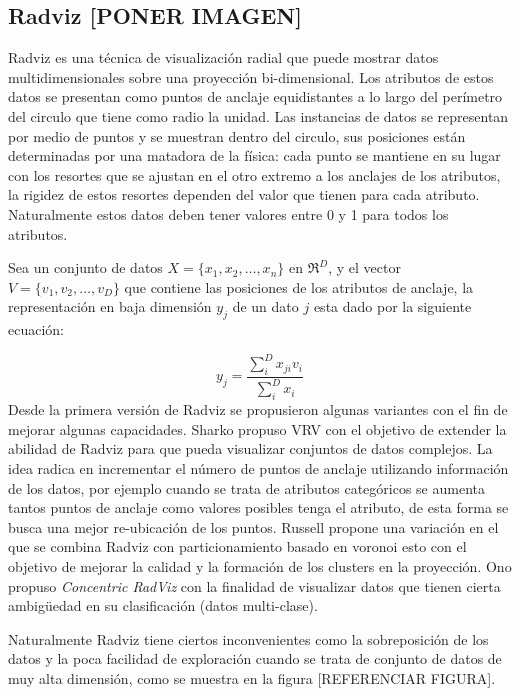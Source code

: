 \subsection{Radviz \textcolor[rgb]{0.2,0.8,0.2}{[PONER IMAGEN]}} 
Radviz \cite{hoffman1997radviz} es una técnica de visualización radial que puede mostrar datos multidimensionales sobre una proyección bi-dimensional. Los atributos de estos datos se presentan como puntos de anclaje equidistantes a lo largo del perímetro del circulo que tiene como radio la unidad. Las instancias de datos se representan por medio de puntos y se muestran dentro del circulo, sus posiciones están determinadas por una matadora de la física: cada punto se mantiene en su lugar con los resortes que se ajustan en el otro extremo a los anclajes de los atributos, la rigidez de estos resortes dependen del valor que tienen para cada atributo. Naturalmente estos datos deben tener valores entre 0 y 1 para todos los atributos. 
\begin{defn} 
Sea un conjunto de datos $X=\{x_1,x_2,\ldots,x_n\}$ en $\Re^D$, y el vector $V=\{v_1,v_2,\ldots,v_D\}$ que contiene las posiciones de los atributos de anclaje, la representación en baja dimensión $y_{j}$ de un dato $j$ esta dado por la siguiente ecuación:
\end{defn}
\begin{equation}
y_{j}=\frac{\sum_{i}^{D}{x_{ji}v_{i}}}{\sum_{i}^{D}{x_{i}}}
\end{equation}
Desde la primera versión de Radviz se propusieron algunas variantes con el fin de mejorar algunas capacidades. Sharko propuso \ac{VRV} \cite{sharko2008vrv} con el objetivo de extender la abilidad de Radviz para que pueda visualizar conjuntos de datos complejos. La idea radica en incrementar el número de puntos de anclaje utilizando información de los datos, por ejemplo cuando se trata de atributos categóricos se aumenta tantos puntos de anclaje como valores posibles tenga el atributo, de esta forma se busca una mejor re-ubicación de los puntos. Russell \cite{russell2012voronoi_radviz} propone una variación en el que se combina Radviz con particionamiento basado en voronoi esto con el objetivo de mejorar la calidad  y la formación de los clusters en la proyección. Ono propuso \textit{Concentric RadViz} \cite{ono2015cradviz} con la finalidad de visualizar datos que tienen cierta ambigüedad en su clasificación (datos multi-clase).

Naturalmente Radviz tiene ciertos inconvenientes como la sobreposición de los datos y la poca facilidad de exploración cuando se trata de conjunto de datos de muy alta dimensión, como se muestra en la figura \textcolor[rgb]{0.2,0.8,0.2}{[REFERENCIAR FIGURA].}
